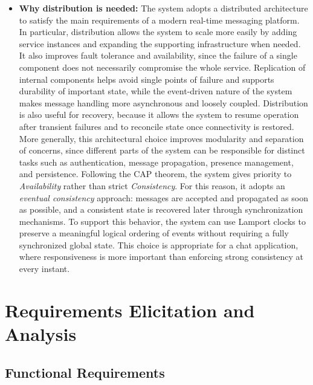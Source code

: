 \documentclass{scrartcl}
\begin{document}
\begin{itemize}
	\item \textbf{Why distribution is needed:} The system adopts a distributed architecture to satisfy the main requirements of a modern real-time messaging platform. In particular, distribution allows the system to scale more easily by adding service instances and expanding the supporting infrastructure when needed. It also improves fault tolerance and availability, since the failure of a single component does not necessarily compromise the whole service. Replication of internal components helps avoid single points of failure and supports durability of important state, while the event-driven nature of the system makes message handling more asynchronous and loosely coupled. Distribution is also useful for recovery, because it allows the system to resume operation after transient failures and to reconcile state once connectivity is restored. More generally, this architectural choice improves modularity and separation of concerns, since different parts of the system can be responsible for distinct tasks such as authentication, message propagation, presence management, and persistence. Following the CAP theorem, the system gives priority to \emph{Availability} rather than strict \emph{Consistency}. For this reason, it adopts an \emph{eventual consistency} approach: messages are accepted and propagated as soon as possible, and a consistent state is recovered later through synchronization mechanisms. To support this behavior, the system can use Lamport clocks to preserve a meaningful logical ordering of events without requiring a fully synchronized global state. This choice is appropriate for a chat application, where responsiveness is more important than enforcing strong consistency at every instant.
\end{itemize}

\section{Requirements Elicitation and Analysis}\label{requirements}

\subsection{Functional Requirements}
\end{document}
